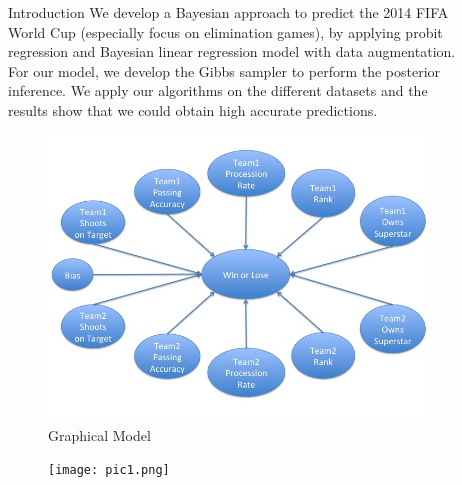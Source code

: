 \documentclass[final]{beamer}
\newlength{\sepwid}
\newlength{\onecolwid}
\newlength{\twocolwid}
\begin{document}
\begin{frame}[t]
\begin{columns}[t]
\begin{column}{\onecolwid}
\begin{block}{Introduction}
We develop a Bayesian approach to predict the 2014 FIFA World Cup (especially focus on elimination games), by applying probit regression and Bayesian linear regression model with data augmentation. For our model, we develop the Gibbs sampler to perform the posterior inference. We apply our algorithms on the different datasets and the results show that we could obtain high accurate predictions.

\end{block}

\begin{figure}
\includegraphics[width=0.8\linewidth]{graph.jpg}
\caption{Graphical Model}
\end{figure}

\begin{figure}
\texttt{[image: pic1.png]}
\end{figure}


\end{column} %

\begin{column}{\sepwid}\end{column} %

\begin{column}{\twocolwid} %

\begin{columns}[t,totalwidth=\twocolwid] %

\begin{column}{\onecolwid}\vspace{-.6in} %


\end{column}
\end{columns}
\end{column}
\end{columns}
\end{frame}
\end{document}
